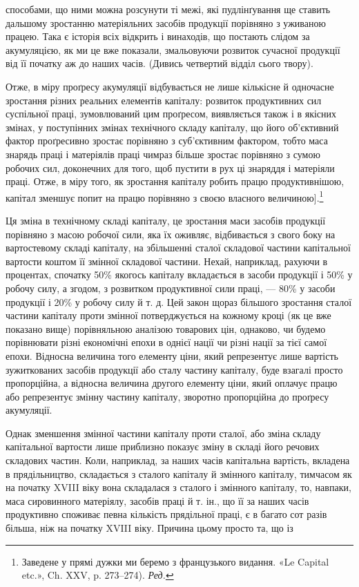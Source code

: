 \parcont{}  %
способами, що ними можна розсунути ті межі, які пудлінґування
ще ставить дальшому зростанню матеріяльних засобів продукції
порівняно з уживаною працею. Така є історія всіх відкрить
і винаходів, що постають слідом за акумуляцією, як ми це
вже показали, змальовуючи розвиток сучасної продукції від її
початку аж до наших часів. (Дивись четвертий відділ сього
твору).

Отже, в міру проґресу акумуляції відбувається не лише
кількісне й одночасне зростання різних реальних елементів
капіталу: розвиток продуктивних сил суспільної праці, зумовлюваний
цим проґресом, виявляється також і в якісних змінах,
у поступінних змінах технічного складу капіталу, що його об’єктивний
фактор проґресивно зростає порівняно з суб’єктивним
фактором, тобто маса знарядь праці і матеріялів праці чимраз
більше зростає порівняно з сумою робочих сил, доконечних для
того, щоб пустити в рух ці знаряддя і матеріяли праці. Отже,
в міру того, як зростання капіталу робить працю продуктивнішою,
капітал зменшує попит на працю порівняно з своєю власного
величиною].\footnote*{
Заведене у прямі дужки ми беремо з французького видання.
«Le Capital etc.», Ch. XXV, p. 273--274). \emph{Ред.}
}

Ця зміна в технічному складі капіталу, це зростання маси
засобів продукції порівняно з масою робочої сили, яка їх оживляє,
відбивається з свого боку на вартостевому складі капіталу, на
збільшенні сталої складової частини капітальної вартости коштом
її змінної складової частини. Нехай, наприклад, рахуючи
в процентах, спочатку 50\% якогось капіталу вкладається в засоби
продукції і 50\% у робочу силу, а згодом, з розвитком продуктивної
сили праці, — 80\% у засоби продукції і 20\% у робочу силу
й т. д. Цей закон щораз більшого зростання сталої частини капіталу
проти змінної потверджується на кожному кроці (як це вже
показано вище) порівняльною аналізою товарових цін, однаково,
чи будемо порівнювати різні економічні епохи в однієї нації
чи різні нації за тієї самої епохи. Відносна величина того елементу
ціни, який репрезентує лише вартість зужиткованих засобів
продукції або сталу частину капіталу, буде взагалі просто
пропорційна, а відносна величина другого елементу ціни, який
оплачує працю або репрезентує змінну частину капіталу, зворотно
пропорційна до проґресу акумуляції.

Однак зменшення змінної частини капіталу проти сталої,
або зміна складу капітальної вартости лише приблизно показує
зміну в складі його речових складових частин. Коли, наприклад,
за наших часів капітальна вартість, вкладена в прядільництво,
складається з  сталого капіталу й  змінного капіталу,
тимчасом як на початку XVIII віку вона складалася з  сталого
і  змінного капіталу, то, навпаки, маса сировинного матеріялу,
засобів праці й т. ін., що її за наших часів продуктивно споживає
певна кількість прядільної праці, є в багато сот разів більша,
ніж на початку XVIII віку. Причина цьому просто та, що із
\parbreak{}  %
